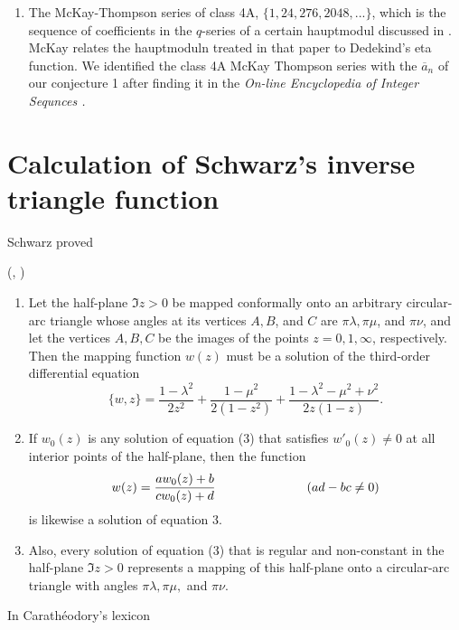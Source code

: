 \documentclass{article}
\begin{document}
\begin{enumerate}
of positive integers not
represented by the quadratic form
$x^2+xy+y^2$ \cite{OEIS}. B. Cloitre
asserts, on the same O.E.I.S.
page, that  $\mathscr{Q}$ is also the set of
non-negative integers $n$
such that
$\delta(n)$ is non-zero, where
$\eta$ is Dedekind's eta function and
$\sum_n \delta(n)x^n = \eta(x^3)/\eta(x)^3.$
\item The McKay-Thompson series of class 4A,
$\{1,24, 276, 2048, ...\}$, which is
the sequence of coefficients 
in the $q$-series of a certain
hauptmodul discussed in \cite{doi}.
McKay relates
the hauptmoduln treated in that paper 
to Dedekind's eta function.
We identified the class 4A
McKay Thompson series with the
$\overline{a}_n$ of our
conjecture 1 after finding it 
in the \it On-line Encyclopedia
of Integer Sequnces \rm \cite{OEIS2}.
\end{enumerate}
\section{Calculation of Schwarz's inverse 
triangle function}
Schwarz
proved 
\begin{theorem}
 (\cite{caratheodory2}, )
\begin{enumerate}
\item
Let the half-plane $\Im z > 0$ be mapped
conformally onto an arbitrary 
circular-arc triangle
whose angles at its vertices $A, B$, and $C$ 
are $\pi \lambda, \pi \mu$, and $\pi \nu$, and
let the vertices $A, B, C$ be the images of
the  points $z = 0, 1, \infty$, respectively.
Then the mapping function $w(z)$ must be 
a solution of the third-order differential
equation
\begin{equation}
\{w,z\} =
\frac{1-\lambda^2}{2 z^2} +
\frac{1-\mu^2}{2(1-z^2)} +
\frac{1-\lambda^2-\mu^2+\nu^2}
{2z(1-z)}.
\end{equation}
\item
If $w_0(z)$ is any solution
of equation (3) that satisfies
$w'_0(z) \neq 0$ at all interior points
of the half-plane, then the function
$$
w(z) = \frac {aw_0(z) + b}{cw_0(z) + d}
\hskip 1in (ad - bc \neq 0)
$$
is likewise a solution of equation 3.
\item
Also, every solution of equation (3) that is regular
and non-constant in the half-plane $\Im z > 0$
represents a mapping of this half-plane onto a
circular-arc triangle with angles $\pi \lambda,
\pi \mu,$ and $\pi \nu$.
\end{enumerate}
\end{theorem}
\noindent
In Carath{\'e}odory's lexicon
\end{document}
